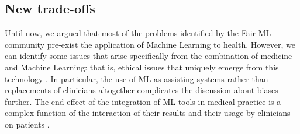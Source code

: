 




\subsection{New trade-offs}
    Until now, we argued that most of the problems identified by the Fair-ML community pre-exist the application of Machine Learning to health.
    However, we can identify some issues that arise specifically from the combination of medicine and Machine Learning: that is, ethical issues that uniquely emerge from this technology \cite{Dijkstra2020}.
    In particular, the use of ML as assisting systems rather than replacements of clinicians altogether complicates the discussion about biases further.
    The end effect of the integration of ML tools in medical practice is a complex function of the interaction of their results and their usage by clinicians on patients \cite[p.~4]{Rajkomar2018}.
